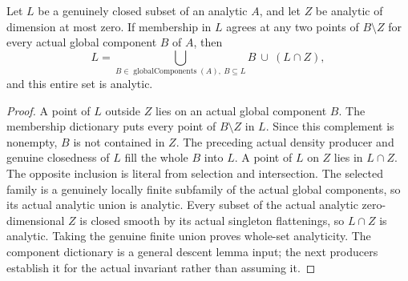 \begin{theorem}
\label{hir:general-two-component-superlevel-descent}
\leanok
Let $L$ be a genuinely closed subset of an analytic $A$, and let $Z$ be
analytic of dimension at most zero. If membership in $L$ agrees at any two
points of $B\setminus Z$ for every actual global component $B$ of $A$, then
\[
 L=\bigcup_{B\in\operatorname{globalComponents}(A),\ B\subseteq L}B
    \ \cup\ (L\cap Z),
\]
and this entire set is analytic.
\end{theorem}
\begin{proof}
A point of $L$ outside $Z$ lies on an actual global component $B$.
The membership dictionary puts every point of $B\setminus Z$ in $L$.
Since this complement is nonempty, $B$ is not contained in $Z$.
The preceding actual density producer and genuine closedness of $L$
fill the whole $B$ into $L$. A point of $L$ on $Z$ lies in $L\cap Z$.
The opposite inclusion is literal from selection and intersection.
The selected family is a genuinely locally finite subfamily of the actual
global components, so its actual analytic union is analytic. Every subset
of the actual analytic zero-dimensional $Z$ is closed smooth by its actual
singleton flattenings, so $L\cap Z$ is analytic. Taking the genuine finite
union proves whole-set analyticity. The component dictionary is a general
descent lemma input; the next producers establish it for the actual
invariant rather than assuming it.
\end{proof}

